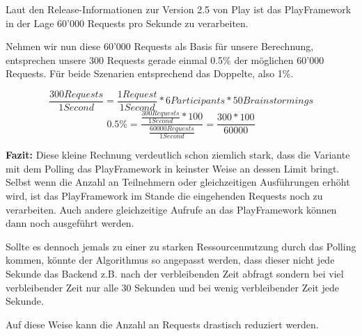 Laut den Release-Informationen zur Version 2.5 von Play \cite{Play25} ist das PlayFramework in der Lage 60'000 Requests pro Sekunde zu verarbeiten.


Nehmen wir nun diese 60'000 Requests als Basis für unsere Berechnung, entsprechen unsere 300 Requests gerade einmal 0.5\% der möglichen 60'000 Requests. Für beide Szenarien entsprechend das Doppelte, also 1\%.

\[\frac{300Requests}{1Second}=\frac{1Request}{1Second}*6Participants *50Brainstormings\]
\[0.5\%= \frac{\frac{300Requests}{1Second} * 100}{\frac{60000Requests}{1Second}} = \frac{300 * 100}{60000}\]

\textbf{Fazit:} Diese kleine Rechnung verdeutlich schon ziemlich stark, dass die Variante mit dem Polling das PlayFramework in keinster Weise an dessen Limit bringt. Selbst wenn die Anzahl an Teilnehmern oder gleichzeitigen Ausführungen erhöht wird, ist das PlayFramework im Stande die eingehenden Requests noch zu verarbeiten. Auch andere gleichzeitige Aufrufe an das PlayFramework können dann noch ausgeführt werden.

Sollte es dennoch jemals zu einer zu starken Ressourcennutzung durch das Polling kommen, könnte der Algorithmus so angepasst werden, dass dieser nicht jede Sekunde das Backend z.B. nach der verbleibenden Zeit abfragt sondern bei viel verbleibender Zeit nur alle 30 Sekunden und bei wenig verbleibender Zeit jede Sekunde.

Auf diese Weise kann die Anzahl an Requests drastisch reduziert werden.
